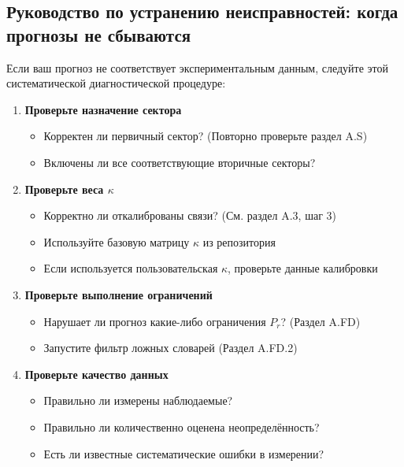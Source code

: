 \documentclass[11pt,a4paper]{article}
\begin{document}
	\subsection*{Руководство по устранению неисправностей: когда прогнозы не сбываются}
	
	Если ваш прогноз не соответствует экспериментальным данным, следуйте этой систематической диагностической процедуре:
	
	\begin{enumerate}
		\item \textbf{Проверьте назначение сектора} 
		\begin{itemize}
			\item Корректен ли первичный сектор? (Повторно проверьте раздел A.S)
			\item Включены ли все соответствующие вторичные секторы?
		\end{itemize}
		
		\item \textbf{Проверьте веса $\kappa$}
		\begin{itemize}
			\item Корректно ли откалиброваны связи? (См. раздел A.3, шаг 3)
			\item Используйте базовую матрицу $\kappa$ из репозитория
			\item Если используется пользовательская $\kappa$, проверьте данные калибровки
		\end{itemize}
		
		\item \textbf{Проверьте выполнение ограничений}
		\begin{itemize}
			\item Нарушает ли прогноз какие-либо ограничения $P_r$? (Раздел A.FD)
			\item Запустите фильтр ложных словарей (Раздел A.FD.2)
		\end{itemize}
		
		\item \textbf{Проверьте качество данных}
		\begin{itemize}
			\item Правильно ли измерены наблюдаемые?
			\item Правильно ли количественно оценена неопределённость?
			\item Есть ли известные систематические ошибки в измерении?
		\end{itemize}
		

\end{enumerate}
\end{document}
